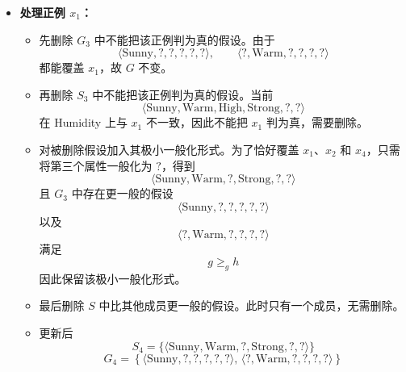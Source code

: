 \documentclass[../main.tex]{subfiles}
\begin{document}
\begin{enumerate}
{\begin{itemize}
    \item \textbf{处理正例 $x_1$：}
    \begin{itemize}
        \item 先删除 $G_3$ 中不能把该正例判为真的假设。由于
        \[
            \langle \text{Sunny}, ?, ?, ?, ?, ? \rangle,\qquad
            \langle ?, \text{Warm}, ?, ?, ?, ? \rangle
        \]
        都能覆盖 $x_1$，故 $G$ 不变。
        \item 再删除 $S_3$ 中不能把该正例判为真的假设。当前
        \[
            \langle \text{Sunny}, \text{Warm}, \text{High}, \text{Strong}, ?, ? \rangle
        \]
        在 Humidity 上与 $x_1$ 不一致，因此不能把 $x_1$ 判为真，需要删除。
        \item 对被删除假设加入其极小一般化形式。为了恰好覆盖 $x_1$、$x_2$ 和 $x_4$，只需将第三个属性一般化为 $?$，得到
        \[
            \langle \text{Sunny}, \text{Warm}, ?, \text{Strong}, ?, ? \rangle
        \]
        且 $G_3$ 中存在更一般的假设
        \[
            \langle \text{Sunny}, ?, ?, ?, ?, ? \rangle
        \]
        以及
        \[
            \langle ?, \text{Warm}, ?, ?, ?, ? \rangle
        \]
        满足
        \[
            g \geq_g h
        \]
        因此保留该极小一般化形式。
        \item 最后删除 $S$ 中比其他成员更一般的假设。此时只有一个成员，无需删除。
        \item 更新后
        \[
            S_4=\{\langle \text{Sunny}, \text{Warm}, ?, \text{Strong}, ?, ? \rangle\}
        \]
        \[
            G_4=
            \left\{
            \langle \text{Sunny}, ?, ?, ?, ?, ? \rangle,\,
            \langle ?, \text{Warm}, ?, ?, ?, ? \rangle
            \right\}
        \]
    \end{itemize}


\end{itemize}}
\end{enumerate}
\end{document}
